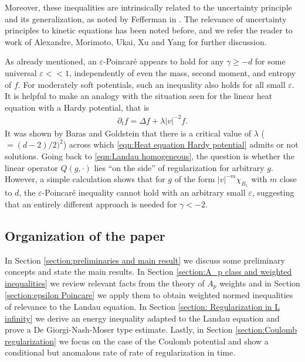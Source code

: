 \documentclass[12pt,american]{amsart}
\numberwithin{equation}{section}
\theoremstyle{plain}
\theoremstyle{definition}                  %
\begin{document}
Moreover, these inequalities are intrinsically related to the uncertainty principle and its generalization, as noted by Fefferman in \cite{Fefferman1983}. The relevance of uncertainty principles to kinetic equations has been noted before, and we refer the reader to work of Alexandre, Morimoto, Ukai, Xu and Yang \cite{AMUXY08} for further discussion. 


As already mentioned, an $\varepsilon$-Poincar\'e appears to hold for any $\gamma\geq -d$ for some universal $\varepsilon <<1$, independently of even the mass, second moment, and entropy of $f$. For moderately soft potentials, such an inequality also holds for all small $\varepsilon$. It is helpful to make an analogy with the situation seen for the linear heat equation with a Hardy potential, that is
\begin{align}\label{eqn:Heat equation Hardy potential}
  \partial_tf = \Delta f + \lambda |v|^{-2}f.
\end{align}
It was shown by Baras and Goldstein \cite{BarasGoldstein1984} that there is a critical value of $\lambda$ ( $=(d-2)/2)^2$) across which \eqref{eqn:Heat equation Hardy potential} admits or not solutions. Going back to \eqref{eqn:Landau homogeneous}, the question is whether the linear operator $Q(g,\cdot)$ lies ``on the side'' of regularization for arbitrary $g$. However, a simple calculation shows that for $g$ of the form $|v|^{-m}\chi_{B_1}$ with $m$ close to $d$, the $\varepsilon$-Poincar\'e inequality cannot hold with an arbitrary small $\varepsilon$, suggesting that an entirely different approach is needed for $\gamma<-2$.
 
\subsection{Organization of the paper} In Section \ref{section:preliminaries and main result} we discuss some preliminary concepts and state the main results. In Section \ref{section:A_p class and weighted inequalities} we review relevant facts from the theory of $A_p$ weights and in Section \ref{section:epsilon Poincare} we apply them to obtain weighted normed inequalities of relevance to the Landau equation. In Section \ref{section: Regularization in L infinity} we derive an energy inequality adapted to the Landau equation and prove a De Giorgi-Nash-Moser type estimate. Lastly, in Section \ref{section:Coulomb regularization} we focus on the case of the Coulomb potential and show a conditional but anomalous rate of rate of regularization in time.
\end{document}
